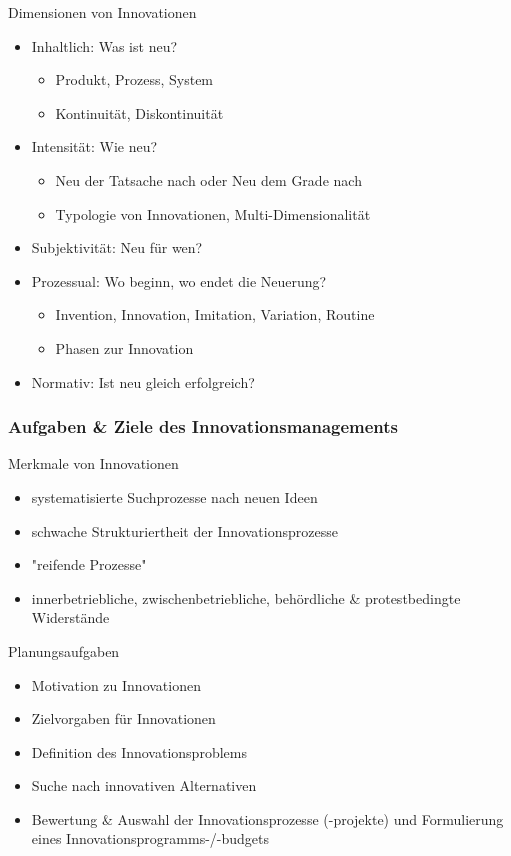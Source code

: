 \documentclass[11pt]{article}
\begin{document}
Dimensionen von Innovationen
\begin{itemize}
\item Inhaltlich: Was ist neu?
\begin{itemize}
\item Produkt, Prozess, System
\item Kontinuität, Diskontinuität
\end{itemize}
\item Intensität: Wie neu?
\begin{itemize}
\item Neu der Tatsache nach oder Neu dem Grade nach
\item Typologie von Innovationen, Multi-Dimensionalität
\end{itemize}
\item Subjektivität: Neu für wen?
\item Prozessual: Wo beginn, wo endet die Neuerung?
\begin{itemize}
\item Invention, Innovation, Imitation, Variation, Routine
\item Phasen zur Innovation
\end{itemize}
\item Normativ: Ist neu gleich erfolgreich?
\end{itemize}

\subsubsection{Aufgaben \& Ziele des Innovationsmanagements}
\label{sec:org2b5c5f9}
Merkmale von Innovationen
\begin{itemize}
\item systematisierte Suchprozesse nach neuen Ideen
\item schwache Strukturiertheit der  Innovationsprozesse
\item "reifende Prozesse"
\item innerbetriebliche, zwischenbetriebliche, behördliche \& protestbedingte Widerstände
\end{itemize}

Planungsaufgaben
\begin{itemize}
\item Motivation zu Innovationen
\item Zielvorgaben für Innovationen
\item Definition des Innovationsproblems
\item Suche nach innovativen Alternativen
\item Bewertung \& Auswahl der Innovationsprozesse (-projekte) und Formulierung eines Innovationsprogramms-/-budgets
\end{itemize}
\end{document}
